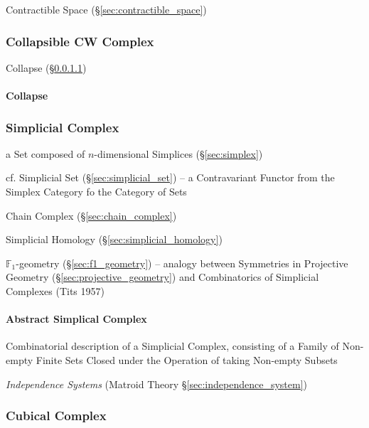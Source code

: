 Contractible Space (\S\ref{sec:contractible_space})



\subsubsection{Collapsible CW Complex}
\label{sec:collapsible_cwcomplex}

Collapse (\S\ref{sec:collapse})



\paragraph{Collapse}\label{sec:collapse}\hfill



\subsubsection{Simplicial Complex}\label{sec:simplicial_complex}

a Set composed of $n$-dimensional Simplices (\S\ref{sec:simplex})

\fist cf. Simplicial Set (\S\ref{sec:simplicial_set}) -- a Contravariant Functor
from the Simplex Category fo the Category of Sets

Chain Complex (\S\ref{sec:chain_complex})

Simplicial Homology (\S\ref{sec:simplicial_homology})

$\mathbb{F}_1$-geometry (\S\ref{sec:f1_geometry}) -- analogy between Symmetries
in Projective Geometry (\S\ref{sec:projective_geometry}) and Combinatorics of
Simplicial Complexes (Tits 1957)



\paragraph{Abstract Simplical Complex}\label{sec:abstract_complex}\hfill

Combinatorial description of a Simplicial Complex, consisting of a Family of
Non-empty Finite Sets Closed under the Operation of taking Non-empty Subsets

\fist \emph{Independence Systems} (Matroid Theory
\S\ref{sec:independence_system})



\subsubsection{Cubical Complex}\label{sec:cubical_complex}



